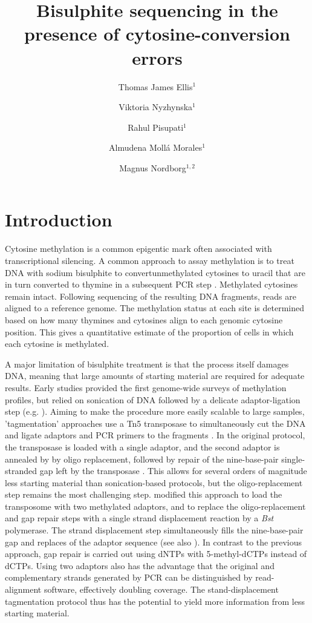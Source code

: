 \documentclass[twocolumn,twoside,lettersize]{article}
\title{Bisulphite sequencing in the presence of cytosine-conversion errors}
\author{
    Thomas James Ellis$^1$
    \and
    Viktoria Nyzhynska$^1$
    \and
    Rahul Pisupati$^1$
    \and
    Almudena Moll\'a Morales$^1$
    \and
    Magnus Nordborg$^{1,2}$
}
\date{
 \begin{list}{}{%
      \setlength{\leftmargin}{0cm}%
      \setlength{\rightmargin}{\leftmargin}}%
  \item\normalsize\bf 
    Bisulphite treatment of DNA converts of unmethylated cytosines to thymine, and is a common approach to infer the methylation status of cytosines.
    'Tagmentation' approaches to bisulphite treatment use a transposase to simultaneously make double-stranded breaks and ligate adaptors to the resulting fragments, allowing for higher throughput with less starting material.
    However, but it has also been noted that certain tagmentation protocols have an unusually high number unmethylated cytosines that are not converted to thymine.
    Here we describe this phenomenon in detail, and find that results are consistent with single strand nicks by the transposase, followed by strand displacement of part or all of the DNA fragments.
    Nevertheless we show that these errors can be accounted for in downstream analysis and need not impede biological conclusions.
    We provide a Python package to allow users to implement this framework.
    Ultimately the additional effort of accounting for errors must be traded off against the scalability of the protocol in planning experiments.
  \end{list}
}
\begin{document}
\maketitle

\section{Introduction}

Cytosine methylation is a common epigentic mark often associated with transcriptional silencing.
A common approach to assay methylation is to treat DNA with sodium bisulphite to convertunmethylated cytosines to uracil that are in turn converted to thymine in a subsequent PCR step \parencite{clark1994high}.
Methylated cytosines remain intact.
Following sequencing of the resulting DNA fragments, reads are aligned to a reference genome.
The methylation status at each site is determined based on how many thymines and cytosines align to each genomic cytosine position.
This gives a quantitative estimate of the proportion of cells in which each cytosine is methylated.

A major limitation of bisulphite treatment is that the process itself damages DNA, meaning that large amounts of starting material are required for adequate results.
Early studies provided the first genome-wide surveys of methylation profiles, but relied on sonication of DNA followed by a delicate adaptor-ligation step (e.g. \cite{meissner2005reduced, cokus2008shotgun, lister2009human}).
Aiming to make the procedure more easily scalable to large samples, 'tagmentation' approaches use a Tn5 transposase to simultaneously cut the DNA and ligate adaptors and PCR primers to the fragments \parencite{wang2013tagmentation}.
In the original protocol, the transposase is loaded with a single adaptor, and the second adaptor is annealed by by oligo replacement, followed by repair of the nine-base-pair single-stranded gap left by the transposase \parencite{adey2012ultra}.
This allows for several orders of magnitude less starting material than sonication-based protocols, but the oligo-replacement step remains the most challenging step.
\textcite{lu2015improved} modified this approach to load the transposome with two methylated adaptors, and to replace the oligo-replacement and gap repair steps with a single strand displacement reaction by a \textit{Bst} polymerase.
The strand displacement step simultaneously fills the nine-base-pair gap and replaces of the adaptor sequence (see also \cite{weichenhan2019generation, suzuki2018whole}).
In contrast to the previous approach, gap repair is carried out using dNTPs with 5-methyl-dCTPs instead of dCTPs.
Using two adaptors also has the advantage that the original and complementary strands generated by PCR can be distinguished by read-alignment software, effectively doubling coverage. 
The stand-displacement tagmentation protocol thus has the potential to yield more information from less starting material.
\end{document}
